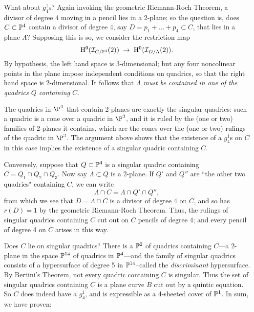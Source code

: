 What about $g^1_4$s? Again invoking the geometric Riemann-Roch Theorem, a divisor of degree 4 moving in a pencil lies in a 2-plane; so the question is, does $C \subset \PP^4$ contain a divisor of degree 4, say $D = p_1+\dots +p_4 \subset C$, that lies in a plane $\Lambda$? Supposing this is so, we consider the restriction map
$$
\HH^0(\cI_{C/\PP^4}(2)) \; \to \; \HH^0(\cI_{D/\Lambda}(2)).
$$
By hypothesis, the left hand space is 3-dimensional; but any four noncolinear points in the plane  impose independent conditions on quadrics,  so that the right hand space is 2-dimensional. It follows that \emph{$\Lambda$ must be contained in one of the quadrics $Q$ containing $C$}. 

The quadrics in $\P^4$ that contain 2-planes are exactly the singular quadrics: such a quadric is a cone over a quadric in $\P^3$, and it is ruled by the (one or two) families of 2-planes it contains, which are the cones over the (one or two) rulings of the quadric in $\P^3$. The argument above shows that the existence of a $g_4^1$s on $C$ in this case implies the existence of a singular quadric containing $C$.

Conversely, suppose that $Q \subset \PP^4$ is a singular quadric containing $C = Q_1 \cap Q_2 \cap Q_3$. Now say $\Lambda \subset Q$ is  a 2-plane. If $Q'$ and $Q''$ are ``the other two quadrics" containing $C$, we can write
$$
\Lambda \cap C = \Lambda \cap Q' \cap Q'', 
$$ 
from which we see that $D = \Lambda \cap C$ is a divisor of degree 4 on $C$, and so has $r(D) = 1$ by the geometric Riemann-Roch Theorem. Thus, the rulings of  singular quadrics containing $C$ cut out on $C$ pencils of degree 4; and every pencil of degree 4 on $C$ arises in this way.

Does $C$ lie on singular quadrics? There is a $\PP^2$ of quadrics containing $C$---a 2-plane in the space $\PP^{14}$ of quadrics in $\PP^4$---and the family of singular quadrics  consists of a  hypersurface of degree 5 in $\PP^{14}$--called the \emph{discriminant} hypersurface. By Bertini's Theorem, not every quadric containing $C$ is singular. Thus the set of singular quadrics containing $C$ is a plane curve $B$ cut out by a quintic equation. So $C$ does indeed have a $g^1_4$, and is expressible as a 4-sheeted cover of $\PP^1$. In sum, we have proven:


